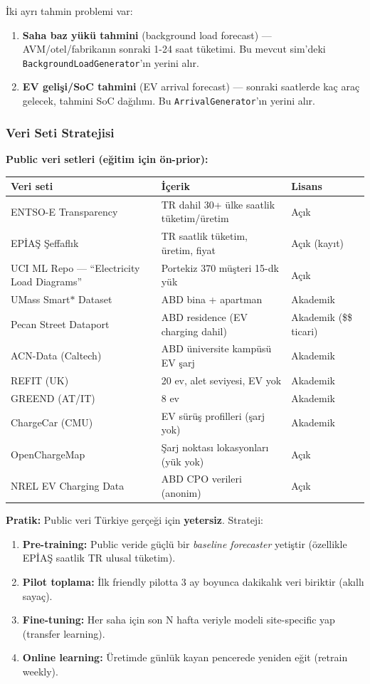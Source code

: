 \documentclass[11pt,a4paper]{article}
\begin{document}
İki ayrı tahmin problemi var:
\begin{enumerate}
    \item \textbf{Saha baz yükü tahmini} (background load forecast) --- AVM/otel/fabrikanın sonraki 1-24 saat tüketimi. Bu mevcut sim'deki \texttt{BackgroundLoadGenerator}'ın yerini alır.
    \item \textbf{EV gelişi/SoC tahmini} (EV arrival forecast) --- sonraki saatlerde kaç araç gelecek, tahmini SoC dağılımı. Bu \texttt{ArrivalGenerator}'ın yerini alır.
\end{enumerate}

\subsubsection{Veri Seti Stratejisi}

\textbf{Public veri setleri (eğitim için ön-prior):}

\begin{tabularx}{\textwidth}{l X l}
\toprule
\textbf{Veri seti} & \textbf{İçerik} & \textbf{Lisans} \\
\midrule
ENTSO-E Transparency & TR dahil 30+ ülke saatlik tüketim/üretim & Açık \\
EPİAŞ Şeffaflık & TR saatlik tüketim, üretim, fiyat & Açık (kayıt) \\
UCI ML Repo --- ``Electricity Load Diagrams'' & Portekiz 370 müşteri 15-dk yük & Açık \\
UMass Smart$\ast$ Dataset & ABD bina + apartman & Akademik \\
Pecan Street Dataport & ABD residence (EV charging dahil) & Akademik (\$\$ ticari) \\
ACN-Data (Caltech) & ABD üniversite kampüsü EV şarj & Akademik \\
REFIT (UK) & 20 ev, alet seviyesi, EV yok & Akademik \\
GREEND (AT/IT) & 8 ev & Akademik \\
ChargeCar (CMU) & EV sürüş profilleri (şarj yok) & Akademik \\
OpenChargeMap & Şarj noktası lokasyonları (yük yok) & Açık \\
NREL EV Charging Data & ABD CPO verileri (anonim) & Açık \\
\bottomrule
\end{tabularx}

\textbf{Pratik:} Public veri Türkiye gerçeği için \textbf{yetersiz}. Strateji:
\begin{enumerate}
    \item \textbf{Pre-training:} Public veride güçlü bir \textit{baseline forecaster} yetiştir (özellikle EPİAŞ saatlik TR ulusal tüketim).
    \item \textbf{Pilot toplama:} İlk friendly pilotta 3 ay boyunca dakikalık veri biriktir (akıllı sayaç).
    \item \textbf{Fine-tuning:} Her saha için son N hafta veriyle modeli site-specific yap (transfer learning).
    \item \textbf{Online learning:} Üretimde günlük kayan pencerede yeniden eğit (retrain weekly).
\end{enumerate}
\end{document}
